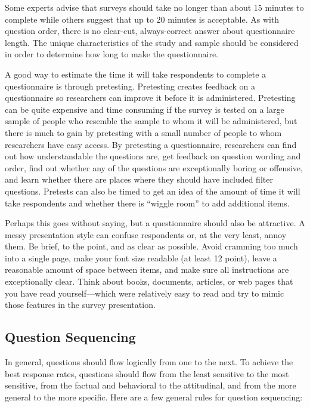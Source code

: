 Some experts advise that surveys should take no longer than about $ 15 $ minutes to complete while others suggest that up to $ 20 $ minutes is acceptable. As with question order, there is no clear-cut, always-correct answer about questionnaire length. The unique characteristics of the study and sample should be considered in order to determine how long to make the questionnaire.

A good way to estimate the time it will take respondents to complete a questionnaire is through pretesting. Pretesting creates feedback on a questionnaire so researchers can improve it before it is administered. Pretesting can be quite expensive and time consuming if the survey is tested on a large sample of people who resemble the sample to whom it will be administered, but there is much to gain by pretesting with a small number of people to whom researchers have easy access. By pretesting a questionnaire, researchers can find out how understandable the questions are, get feedback on question wording and order, find out whether any of the questions are exceptionally boring or offensive, and learn whether there are places where they should have included filter questions. Pretests can also be timed to get an idea of the amount of time it will take respondents and whether there is ``wiggle room'' to add additional items.

Perhaps this goes without saying, but a questionnaire should also be attractive. A messy presentation style can confuse respondents or, at the very least, annoy them. Be brief, to the point, and as clear as possible. Avoid cramming too much into a single page, make your font size readable (at least 12 point), leave a reasonable amount of space between items, and make sure all instructions are exceptionally clear. Think about books, documents, articles, or web pages that you have read yourself—which were relatively easy to read and try to mimic those features in the survey presentation.

\subsection{Question Sequencing}

In general, questions should flow logically from one to the next. To achieve the best response rates, questions should flow from the least sensitive to the most sensitive, from the factual and behavioral to the attitudinal, and from the more general to the more specific. Here are a few general rules for question sequencing:

